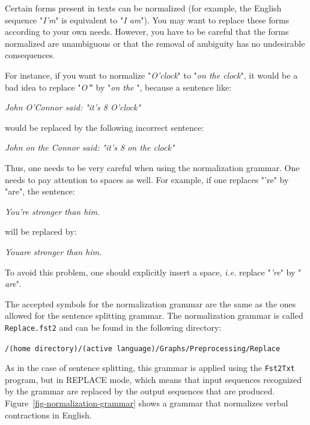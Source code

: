 Certain forms present in texts can be normalized (for example, the English
sequence "\textit{I'm}" is equivalent to "\textit{I am}"). You may want to
replace these forms according to your own needs. However, you have to be careful
that the  forms normalized  are unambiguous or that the removal of ambiguity has
no undesirable consequences.

\bigskip
\noindent For instance, if you want to normalize "\textit{O'clock}" to "\textit{on the
clock}", it would be a bad idea to replace "\textit{O'}" by "\textit{on the }",
because a sentence like:

\bigskip
\textit{John O'Connor said: "it's 8 O'clock"}

\bigskip
\noindent would be replaced by the following incorrect sentence:

\bigskip
\textit{John on the Connor said: "it's 8 on the clock"}

\bigskip
\noindent Thus, one needs to be very careful when using the
normalization grammar. One needs to pay attention to spaces as well. 
For example, if one replaces "'re" by "are", the sentence:

\bigskip
\textit{You're stronger than him.}

\bigskip
\noindent will be replaced by:

\bigskip
\textit{Youare stronger than him.}

\bigskip
\noindent To avoid this problem, one should explicitly insert a space,
\textit{i.e.} replace "\textit{'re}" by "\textit{ are}".

\bigskip
\noindent The accepted symbols for the normalization grammar are the same as the ones
allowed for the sentence splitting grammar. The normalization grammar is called
\verb+Replace.fst2+ and can be found in the following directory:

\bigskip \verb+/(home directory)/(active language)/Graphs/Preprocessing/Replace+

\bigskip
\noindent As in the case of sentence splitting, this grammar is applied using the
\verb+Fst2Txt+ 
program, but in REPLACE mode, which means that input sequences recognized by the
grammar are replaced by the output sequences that are produced.
Figure~\ref{fig-normalization-grammar} shows a grammar that
normalizes verbal contractions in English.

